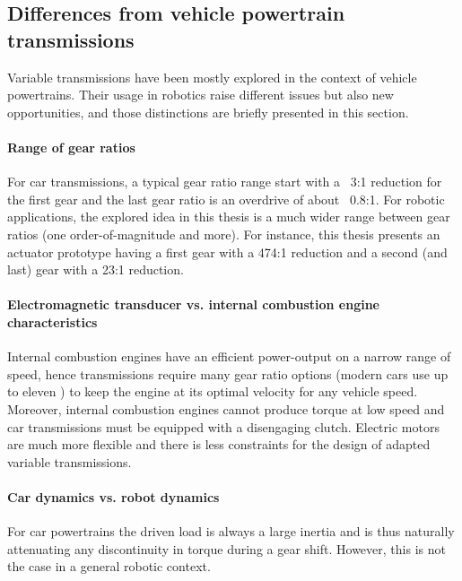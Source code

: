 

\subsection{Differences from vehicle powertrain transmissions}

Variable transmissions have been mostly explored in the context of vehicle powertrains. Their usage in robotics raise different issues but also new opportunities, and those distinctions are briefly presented in this section.

\paragraph{Range of gear ratios}
%
For car transmissions, a typical gear ratio range start with a ~3:1 reduction for the first gear and the last gear ratio is an overdrive of about ~0.8:1. For robotic applications, the explored idea in this thesis is a much wider range between gear ratios (one order-of-magnitude and more). For instance, this thesis presents an actuator prototype having a first gear with a 474:1 reduction and a second (and last) gear with a 23:1 reduction. 

\paragraph{Electromagnetic transducer vs. internal combustion engine characteristics}
%
Internal combustion engines have an efficient power-output on a narrow range of speed, hence transmissions require many gear ratio options (modern cars use up to eleven \cite{goleski_multi-speed_2015}) to keep the engine at its optimal velocity for any vehicle speed. Moreover, internal combustion engines cannot produce torque at low speed and car transmissions must be equipped with a disengaging clutch.  Electric motors are much more flexible and there is less constraints for the design of adapted variable transmissions. 

\paragraph{Car dynamics vs. robot dynamics}
%
For car powertrains the driven load is always a large inertia and is thus naturally attenuating any discontinuity in torque during a gear shift. However, this is not the case in a general robotic context. 

